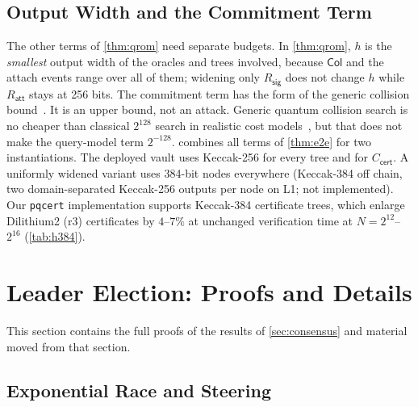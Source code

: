 \documentclass[10pt,journal,compsoc]{IEEEtran}
\theoremstyle{tplain}
\theoremstyle{tdef}
\theoremstyle{remark}
\newcommand{\Rsig}{R_{\mathsf{sig}}}
\newcommand{\Ratt}{R_{\mathsf{att}}}
\newcommand{\cert}{\mathsf{cert}}
\begin{document}
\subsection{Output Width and the Commitment Term}\label{S-cert-budget}
The other terms of \cref{thm:qrom} need separate budgets. In \cref{thm:qrom}, $h$ is the \emph{smallest} output width of the oracles and trees involved, because $\mathsf{Col}$ and the attach events range over all of them; widening only $\Rsig$ does not change $h$ while $\Ratt$ stays at 256 bits. The commitment term has the form of the generic collision bound~\cite{bht1998}. It is an upper bound, not an attack. Generic quantum collision search is no cheaper than classical $2^{128}$ search in realistic cost models~\cite{bernstein2009collisions,nistcfp2016}, but that does not make the query-model term $2^{-128}$.  combines all terms of \cref{thm:e2e} for two instantiations. The deployed vault uses Keccak-256 for every tree and for $C_{\cert}$. A uniformly widened variant uses 384-bit nodes everywhere (Keccak-384 off chain, two domain-separated Keccak-256 outputs per node on L1; not implemented). Our \texttt{pqcert} implementation supports Keccak-384 certificate trees, which enlarge Dilithium2 (r3) certificates by $4$--$7\%$ at unchanged verification time at $N=2^{12}$--$2^{16}$ (\cref{tab:h384}).
\section{Leader Election: Proofs and Details}\label{S-consensus}

This section contains the full proofs of the results of \cref{sec:consensus} and material moved from that section.

\subsection{Exponential Race and Steering}\label{S-cons-race}
\end{document}
